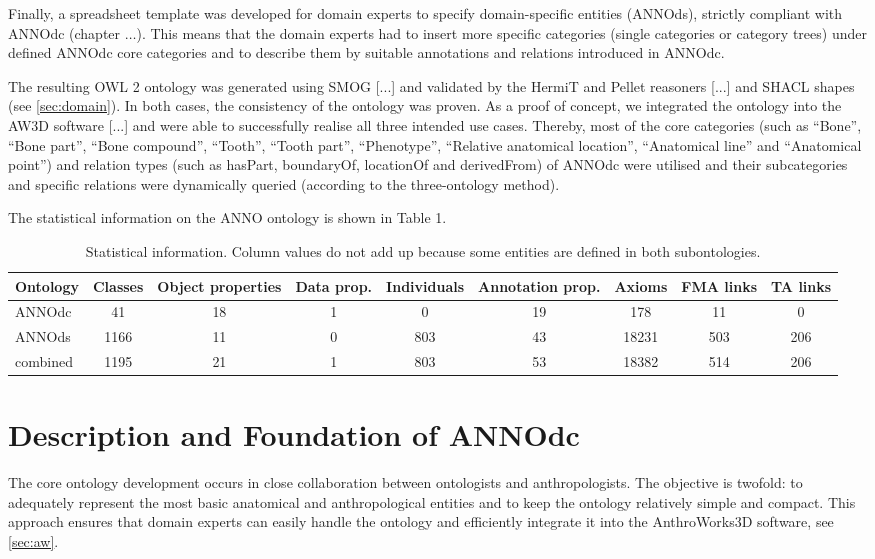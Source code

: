 \documentclass[sw]{iosart2x}
\newcommand{\aw}{AnthroWorks3D}
\begin{document}
Finally, a spreadsheet template was developed for domain experts to specify domain-specific entities (ANNOds), strictly compliant with ANNOdc (chapter $\ldots$).
This means that the domain experts had to insert more specific categories (single categories or category trees) under defined ANNOdc core categories and to describe them by suitable annotations and relations introduced in ANNOdc.

The resulting OWL 2 ontology was generated using SMOG [...] and validated by the HermiT and Pellet reasoners [...] and SHACL shapes (see \cref{sec:domain}).
In both cases, the consistency of the ontology was proven.
As a proof of concept, we integrated the ontology into the AW3D software [...] and were able to successfully realise all three intended use cases.
Thereby, most of the core categories (such as \enquote{Bone}, \enquote{Bone part}, \enquote{Bone compound}, \enquote{Tooth}, \enquote{Tooth part}, \enquote{Phenotype}, \enquote{Relative anatomical location}, \enquote{Anatomical line} and \enquote{Anatomical point}) and relation types (such as hasPart, boundaryOf, locationOf and derivedFrom) of ANNOdc were utilised and their subcategories and specific relations were dynamically queried (according to the three-ontology method).

The statistical information on the ANNO ontology is shown in Table 1.

\begin{table}[b]
\centering
\caption{Statistical information. Column values do not add up because some entities are defined in both subontologies.}
\label{tab:stats}
\begin{tabulary}{\textwidth}{lSSSSSSSS}
\toprule
Ontology	&\textnormal{Classes}	&\textnormal{Object properties}	&\textnormal{Data prop.}	&\textnormal{Individuals}	&\textnormal{Annotation prop.}	&\textnormal{Axioms}	&\textnormal{FMA links}				&\textnormal{TA links}\\
\midrule
ANNOdc		&41						&18								&1								&0							&19									&178					&11							&0\\
ANNOds		&1166					&11								&0								&803						&43									&18231					&503						&206\\
\midrule
combined	&1195					&21								&1								&803						&53									&18382					&514						&206\\
\bottomrule
\end{tabulary}
\end{table}

\section{Description and Foundation of ANNOdc}\label{sec:core}
The core ontology development occurs in close collaboration between ontologists and anthropologists.
The objective is twofold: to adequately represent the most basic anatomical and anthropological entities and to keep the ontology relatively simple and compact.
This approach ensures that domain experts can easily handle the ontology and efficiently integrate it into the \aw{} software, see \cref{sec:aw}.
\end{document}
